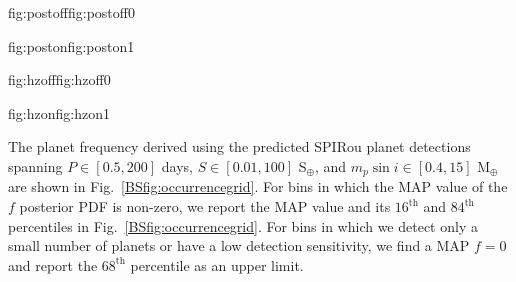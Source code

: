 \begin{figure*}
  \centering
  \hspace{-\hsize}%
  \begin{ocg}{fig:postoff}{fig:postoff}{0}%
  \end{ocg}%
  \begin{ocg}{fig:poston}{fig:poston}{1}%
  \end{ocg}
  \hspace{-\hsize}%
  \begin{ocg}{fig:hzoff}{fig:hzoff}{0}%
  \end{ocg}%
  \begin{ocg}{fig:hzon}{fig:hzon}{1}%
  \end{ocg}
  \hspace{-\hsize}%
  \caption{Coarsely binned maps of the RV planet frequency derived from the  
    SLS-PS as a function of minimum planet mass and orbital period 
    (\emph{left}) and insolation (\emph{right}). The \emph{dashed vertical lines} in the
    insolation panel indicate the approximate `water-loss' and `maximum-greenhouse' insolation limits
    of the  from \cite{kopparapu13}.
    The \emph{dashed-dotted vertical lines}
    indicate the more conservative `recent-Venus' and `early-Mars' HZ limits \citep{kopparapu13}. 
    Over-plotted in each bin are the   
     derived from
    the SLS-PS planet detections (Fig.~\ref{BSfig:yield}) and sensitivity (Fig.~\ref{BSfig:sensitivity}) using
    Eq.~\ref{BSeq:freqpost}. When the planet frequency PDF is consistent with 0 we
    report the $68^{\text{th}}$ percentile as an upper limit. When a non-zero planet frequency is detected
    we report the MAP value along with the $16^{\text{th}}$ and $84^{\text{th}}$ percentiles.}
  \label{BSfig:occurrencegrid}
\end{figure*}

The planet frequency derived using the predicted SPIRou planet detections spanning
$P \in [0.5,200]$ days, $S \in [0.01,100]$ S$_{\oplus}$, and $m_p\sin{i} \in [0.4,15]$ M$_{\oplus}$
are shown in Fig.~\ref{BSfig:occurrencegrid}. For bins in which the MAP value of the $f$ posterior PDF
is non-zero, we report the MAP value and its $16^{\text{th}}$ and $84^{\text{th}}$ percentiles in
Fig.~\ref{BSfig:occurrencegrid}. For bins
in which we detect only a small number of planets or have a low detection sensitivity, we find a MAP
$f=0$ and report the $68^{\text{th}}$ percentile as an upper limit.

